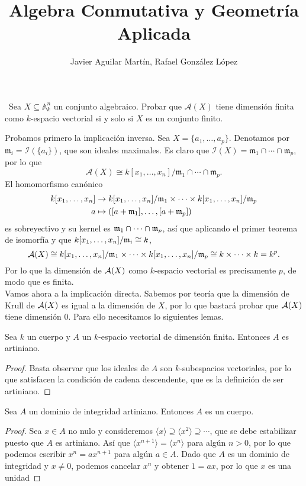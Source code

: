\documentclass[twoside]{article}
\begin{document}
\title{Algebra Conmutativa y Geometría Aplicada}
\author{Javier Aguilar Martín, Rafael González López}
\maketitle
\begin{ejercicio}{3}\
Sea $X \subseteq \mathbb{A}^n_k$
un conjunto algebraico. Probar que $\mathcal{A}(X)$ tiene
dimensión finita como $k$-espacio vectorial si y solo si $X$ es un conjunto finito.
\end{ejercicio}
\begin{solucion}
Probamos primero la implicación inversa. Sea $X=\{a_1,\dots,a_p\}$. Denotamos por $\mathfrak{m}_i=\mathcal{I}(\{a_i\})$, que son ideales maximales. Es claro que $\mathcal{I}(X)=\mathfrak{m}_1\cap\cdots\cap\mathfrak{m}_p$, por lo que $$\mathcal{A}(X) \cong k[x_1,\dots,x_n]/\mathfrak{m}_1\cap\cdots\cap\mathfrak{m}_p.$$ El homomorfismo canónico
\begin{align*}
k[x_1,\dots,x_n]&\to k[x_1,\dots,x_n]/\mathfrak{m}_1\times\cdots\times k[x_1,\dots,x_n]/\mathfrak{m}_p\\
a&\mapsto ([a+\mathfrak{m}_1],\dots,[a+\mathfrak{m}_p])
\end{align*}
es sobreyectivo y su kernel es $\mathfrak{m}_1\cap\cdots\cap\mathfrak{m}_p$, así que aplicando el primer teorema de isomorfía y que  $k[x_1,\dots,x_n]/\mathfrak{m}_i\cong k$, 
$$
\mathcal{A}(X)\cong k[x_1,\dots,x_n]/\mathfrak{m}_1\times\cdots\times k[x_1,\dots,x_n]/\mathfrak{m}_p\cong k\times\cdots\times k=k^p.
$$
Por lo que la dimensión de $\mathcal{A}(X)$ como $k$-espacio vectorial es precisamente $p$, de modo que es finita.\\

Vamos ahora a la implicación directa. Sabemos por teoría que la dimensión de Krull de $\mathcal{A}(X)$ es igual a la dimensión de $X$, por lo que bastará probar que $\mathcal{A}(X)$ tiene dimensión 0. Para ello necesitamos lo siguientes lemas.

\newpage

\begin{lemma}\label{lema}
Sea $k$ un cuerpo y $A$ un $k$-espacio vectorial de dimensión finita. Entonces $A$ es artiniano.
\end{lemma}
\begin{proof}
Basta observar que los ideales de $A$ son $k$-subespacios vectoriales, por lo que satisfacen la condición de cadena descendente, que es la definición de ser artiniano.
\end{proof}



\begin{lemma}
Sea $A$ un dominio de integridad artiniano. Entonces $A$ es un cuerpo. 
\end{lemma}
\begin{proof}
Sea $x\in A$ no nulo y consideremos $\langle x\rangle\supseteq\langle x^2\rangle\supseteq\cdots$, que se debe estabilizar puesto que $A$ es artiniano. Así que $\langle x^{n+1}\rangle=\langle x^n\rangle$ para algún $n>0$, por lo que podemos escribir $x^n=ax^{n+1}$ para algún $a\in A$. Dado que $A$ es un dominio de integridad y $x\neq 0$, podemos cancelar $x^n$ y obtener $1=ax$, por lo que $x$ es una unidad
\end{proof}


\end{solucion}
\end{document}
